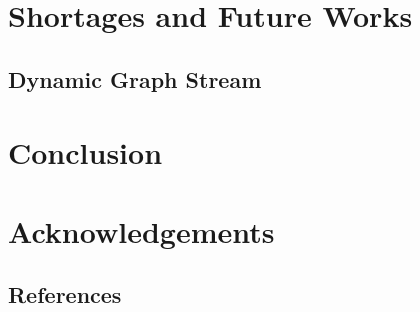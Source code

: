 \documentclass{article}
\begin{document}
	\section{Shortages and Future Works}
	\subsection{Dynamic Graph Stream}

	\section{Conclusion}

	\section{Acknowledgements}

	\begin{appendix}
		\section{References}
		
		
	\end{appendix}
\end{document}
